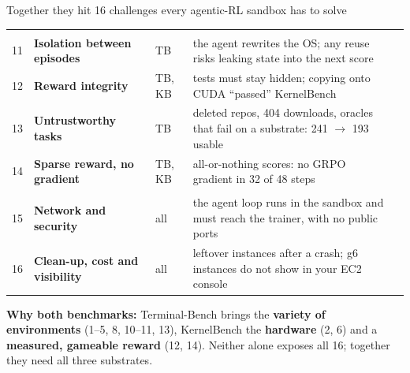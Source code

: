 \begin{frame}{Together they hit 16 challenges every agentic-RL sandbox has to solve}
\begin{tabularx}{\textwidth}{@{}P{0.02\textwidth} P{0.23\textwidth} P{0.07\textwidth} Y P{0.06\textwidth}@{}}
\\
11 & \textbf{Isolation between episodes} & TB & the agent rewrites the OS; any reuse risks leaking state into the next score & \\
12 & \textbf{Reward integrity} & TB, KB & tests must stay hidden; copying  onto CUDA ``passed'' KernelBench & \\
13 & \textbf{Untrustworthy tasks} & TB & deleted repos, 404 downloads, oracles that fail on a substrate: 241 $\rightarrow$ 193 usable & \\
14 & \textbf{Sparse reward, no gradient} & TB, KB & all-or-nothing scores: no GRPO gradient in 32 of 48 steps & \\
\\
15 & \textbf{Network and security} & all & the agent loop runs in the sandbox and must reach the trainer, with no public ports & \\
16 & \textbf{Clean-up, cost and visibility} & all & leftover instances after a crash; g6 instances do not show in your EC2 console & \\
\bottomrule
\end{tabularx}
\par\vspace{1mm}
{\scriptsize\textbf{Why both benchmarks:} Terminal-Bench brings the \textbf{variety of environments} (1--5, 8, 10--11, 13), KernelBench the
\textbf{hardware} (2, 6) and a \textbf{measured, gameable reward} (12, 14). Neither alone exposes all 16; together they need all three substrates.\par}
\end{frame}

